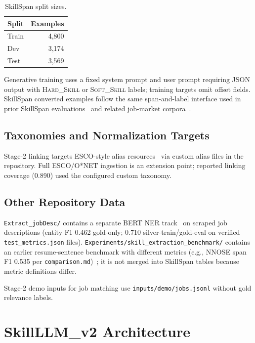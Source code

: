 \documentclass[12pt,oneside]{report}
\begin{document}
\begin{table}[htbp]
  \centering
  \caption{SkillSpan split sizes.}
  \label{tab:splits}
  \begin{tabular}{lr}
    \toprule
    Split & Examples \\
    \midrule
    Train & 4{,}800 \\
    Dev   & 3{,}174 \\
    Test  & 3{,}569 \\
    \bottomrule
  \end{tabular}
\end{table}

Generative training uses a fixed system prompt and user prompt requiring JSON output with \textsc{Hard\_Skill} or \textsc{Soft\_Skill} labels; training targets omit offset fields.
SkillSpan converted examples follow the same span-and-label interface used in prior SkillSpan evaluations~\cite{zhang2022skillspan} and related job-market corpora~\cite{green2022benchmark,gnehm2022finegrained}.

\section{Taxonomies and Normalization Targets}

Stage-2 linking targets ESCO-style alias resources~\cite{levrang2014esco,zhang2024entitylinking} via custom alias files in the repository.
Full ESCO/O*NET ingestion is an extension point; reported linking coverage (0.890) used the configured custom taxonomy.

\section{Other Repository Data}

\texttt{Extract\_jobDesc/} contains a separate BERT NER track~\cite{devlin2019bert} on scraped job descriptions (entity F1 0.462 gold-only; 0.710 silver-train/gold-eval on verified \texttt{test\_metrics.json} files).
\texttt{Experiments/skill\_extraction\_benchmark/} contains an earlier resume-sentence benchmark with different metrics (e.g., NNOSE span F1 0.535 per \texttt{comparison.md})~\cite{zhang2024nnose}; it is not merged into SkillSpan tables because metric definitions differ.

Stage-2 demo inputs for job matching use \texttt{inputs/demo/jobs.jsonl} without gold relevance labels.

\chapter{SkillLLM\_v2 Architecture}
\label{ch:arch}
\end{document}
